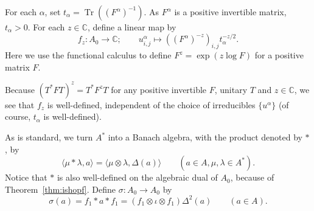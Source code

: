 \documentclass[twoside,a4paper,12pt]{article}
\theoremstyle{plain}
\theoremstyle{definition}
\newcommand{\ip}[2]{\langle #1,#2 \rangle}
\newcommand{\tr}{\operatorname{Tr}}
\begin{document}
For each $\alpha$, set $t_\alpha = \tr((F^\alpha)^{-1})$.  As $F^\alpha$ is
a positive invertible matrix, $t_\alpha>0$.
For each $z\in\mathbb C$, define a linear map by
\[ f_z:A_0\rightarrow\mathbb C; \qquad
u^\alpha_{i,j} \mapsto ((F^\alpha)^{-z})_{i,j} t_\alpha^{-z/2}. \]
Here we use the functional calculus to define $F^z = \exp(z\log F)$ for
a positive matrix $F$.

Because $(T^*FT)^z = T^* F^z T$ for any positive invertible $F$, unitary $T$
and $z\in\mathbb C$, we see that $f_z$ is well-defined, independent of the
choice of irreducibles $\{ u^\alpha \}$ (of course, $t_\alpha$ is
well-defined).

As is standard, we turn $A^*$ into a Banach algebra, with the product denoted
by $*$, by
\[ \ip{\mu*\lambda}{a} = \ip{\mu\otimes\lambda}{\Delta(a)}
\qquad (a\in A, \mu,\lambda\in A^*). \]
Notice that $*$ is also well-defined on the algebraic dual of $A_0$,
because of Theorem~\ref{thm:ishopf}.  Define $\sigma:A_0\rightarrow A_0$ by
\[ \sigma(a) = f_1* a * f_1 = (f_1 \otimes \iota \otimes f_1)\Delta^2(a)
\qquad (a\in A). \]
\end{document}
